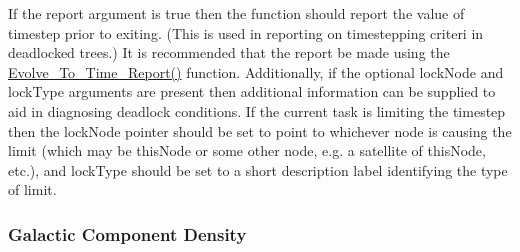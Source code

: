 If the {\normalfont \ttfamily report} argument is {\normalfont \ttfamily true} then the function should report the value of {\normalfont \ttfamily timestep} prior to exiting. (This is used in reporting on timestepping criteri in deadlocked trees.) It is recommended that the report be made using the \hyperlink{merger_trees.evolve.timesteps.report.F90:evolve_to_time_reports:evolve_to_time_report}{\normalfont \ttfamily Evolve\_To\_Time\_Report()} function. Additionally, if the optional {\normalfont \ttfamily lockNode} and {\normalfont \ttfamily lockType} arguments are present then additional information can be supplied to aid in diagnosing deadlock conditions. If the current task is limiting the timestep then the {\normalfont \ttfamily lockNode} pointer should be set to point to whichever node is causing the limit (which may be {\normalfont \ttfamily thisNode} or some other node, e.g. a satellite of {\normalfont \ttfamily thisNode}, etc.), and {\normalfont \ttfamily lockType} should be set to a short description label identifying the type of limit.

\subsubsection{Galactic Component Density}\label{sec:GalacticComponentDensity}

